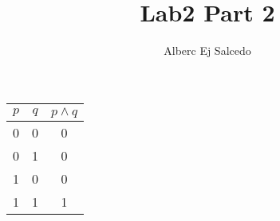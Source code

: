 \documentclass[11pt]{article}
\title{Lab2 Part 2}
\author{Alberc Ej Salcedo}
\begin{document}
\maketitle

\begin{tabular}{|c|c|c|}
\hline
$p$ & $q$ & $p \land q$ \\
\hline
0 & 0 & 0 \\
0 & 1 & 0 \\
1 & 0 & 0 \\
1 & 1 & 1 \\
\hline
\end{tabular}
\end{document}
